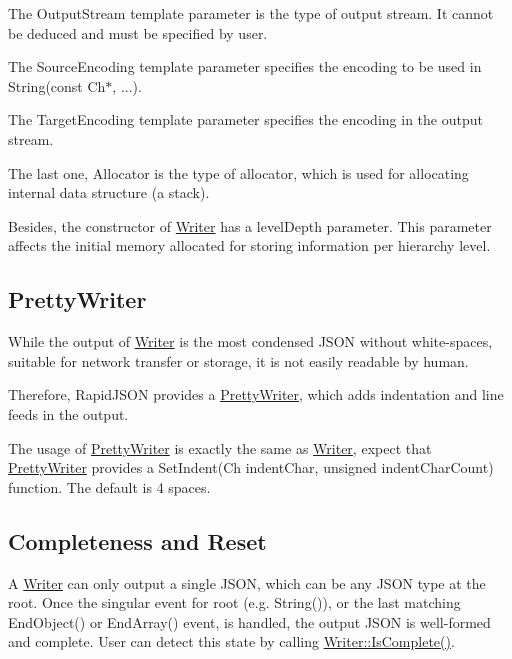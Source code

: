 The {\ttfamily Output\+Stream} template parameter is the type of output stream. It cannot be deduced and must be specified by user.

The {\ttfamily Source\+Encoding} template parameter specifies the encoding to be used in {\ttfamily String(const Ch$\ast$, ...)}.

The {\ttfamily Target\+Encoding} template parameter specifies the encoding in the output stream.

The last one, {\ttfamily Allocator} is the type of allocator, which is used for allocating internal data structure (a stack).

Besides, the constructor of {\ttfamily \hyperlink{class_writer}{Writer}} has a {\ttfamily level\+Depth} parameter. This parameter affects the initial memory allocated for storing information per hierarchy level.\hypertarget{md_Cadriciel_Commun_Externe_RapidJSON_doc_sax.zh-cn_PrettyWriter}{}\subsection{Pretty\+Writer}\label{md_Cadriciel_Commun_Externe_RapidJSON_doc_sax.zh-cn_PrettyWriter}
While the output of {\ttfamily \hyperlink{class_writer}{Writer}} is the most condensed J\+S\+ON without white-\/spaces, suitable for network transfer or storage, it is not easily readable by human.

Therefore, Rapid\+J\+S\+ON provides a {\ttfamily \hyperlink{class_pretty_writer}{Pretty\+Writer}}, which adds indentation and line feeds in the output.

The usage of {\ttfamily \hyperlink{class_pretty_writer}{Pretty\+Writer}} is exactly the same as {\ttfamily \hyperlink{class_writer}{Writer}}, expect that {\ttfamily \hyperlink{class_pretty_writer}{Pretty\+Writer}} provides a {\ttfamily Set\+Indent(\+Ch indent\+Char, unsigned indent\+Char\+Count)} function. The default is 4 spaces.\hypertarget{md_Cadriciel_Commun_Externe_RapidJSON_doc_sax.zh-cn_CompletenessReset}{}\subsection{Completeness and Reset}\label{md_Cadriciel_Commun_Externe_RapidJSON_doc_sax.zh-cn_CompletenessReset}
A {\ttfamily \hyperlink{class_writer}{Writer}} can only output a single J\+S\+ON, which can be any J\+S\+ON type at the root. Once the singular event for root (e.\+g. {\ttfamily String()}), or the last matching {\ttfamily End\+Object()} or {\ttfamily End\+Array()} event, is handled, the output J\+S\+ON is well-\/formed and complete. User can detect this state by calling {\ttfamily \hyperlink{class_writer_aced42429d1b31a565c5ca0310bf4e276}{Writer\+::\+Is\+Complete()}}.

